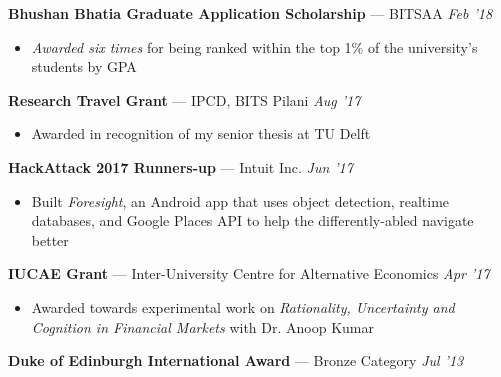 \documentclass[10pt]{article}
\newenvironment{innerlist}[1][\enskip\textbullet]%
        {\begin{itemize}[#1,leftmargin=*,parsep=0pt,itemsep=0pt,topsep=0pt,partopsep=0pt]}
        {\end{itemize}}
\newcommand{\halfblankline}{\quad\vspace{-0.5\baselineskip}\pagebreak[3]}
\begin{document}
\halfblankline

\textbf{Bhushan Bhatia Graduate Application Scholarship} --- BITSAA \hfill \emph{Feb '18}
\begin{innerlist}
\item[] \emph{Awarded six times} for being ranked within the top 1\% of the university's students by GPA
\end{innerlist}

\halfblankline

\textbf{Research Travel Grant} --- IPCD, BITS Pilani \hfill \emph{Aug '17}
\begin{innerlist}
\item[] Awarded in recognition of my senior thesis at TU Delft
\end{innerlist}
\halfblankline

\textbf{HackAttack 2017 Runners-up} --- Intuit Inc. \hfill \emph{Jun '17}
\begin{innerlist}
\item[] Built \textit{Foresight}, an Android app that uses object detection, realtime databases, and Google Places API to help the differently-abled navigate better
\end{innerlist}

\halfblankline

\textbf{IUCAE Grant} --- Inter-University Centre for Alternative Economics
\hfill \emph{Apr '17}
\begin{innerlist}
\item[] Awarded towards experimental work on \emph{Rationality, Uncertainty and Cognition in Financial Markets} with Dr. Anoop Kumar
\end{innerlist}

\halfblankline

\textbf{Duke of Edinburgh International Award} --- Bronze Category \hfill \emph{Jul '13}
\end{document}
